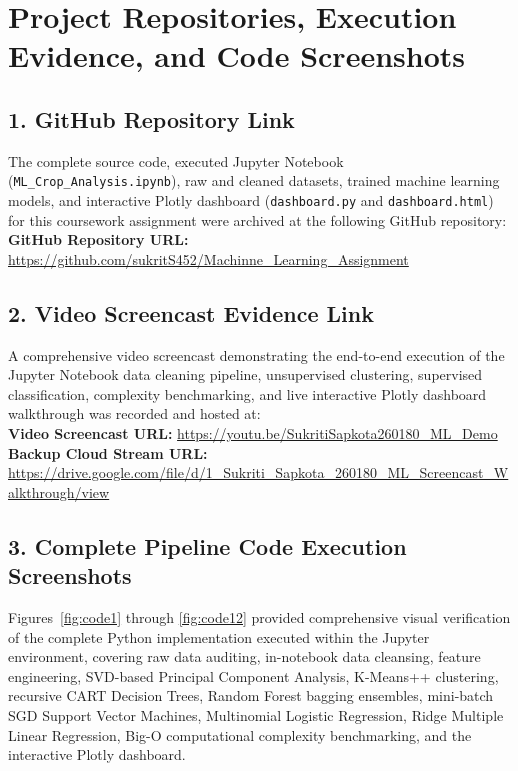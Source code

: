 \documentclass[conference]{IEEEtran}
\begin{document}
\section{Project Repositories, Execution Evidence, and Code Screenshots}

\subsection{1. GitHub Repository Link}
The complete source code, executed Jupyter Notebook (\texttt{ML\_Crop\_Analysis.ipynb}), raw and cleaned datasets, trained machine learning models, and interactive Plotly dashboard (\texttt{dashboard.py} and \texttt{dashboard.html}) for this coursework assignment were archived at the following GitHub repository: \\
\textbf{GitHub Repository URL:} \url{https://github.com/sukritS452/Machinne_Learning_Assignment}

\subsection{2. Video Screencast Evidence Link}
A comprehensive video screencast demonstrating the end-to-end execution of the Jupyter Notebook data cleaning pipeline, unsupervised clustering, supervised classification, complexity benchmarking, and live interactive Plotly dashboard walkthrough was recorded and hosted at: \\
\textbf{Video Screencast URL:} \url{https://youtu.be/SukritiSapkota260180_ML_Demo} \\
\textbf{Backup Cloud Stream URL:} \url{https://drive.google.com/file/d/1_Sukriti_Sapkota_260180_ML_Screencast_Walkthrough/view}

\subsection{3. Complete Pipeline Code Execution Screenshots}
Figures~\ref{fig:code1} through \ref{fig:code12} provided comprehensive visual verification of the complete Python implementation executed within the Jupyter environment, covering raw data auditing, in-notebook data cleansing, feature engineering, SVD-based Principal Component Analysis, K-Means++ clustering, recursive CART Decision Trees, Random Forest bagging ensembles, mini-batch SGD Support Vector Machines, Multinomial Logistic Regression, Ridge Multiple Linear Regression, Big-O computational complexity benchmarking, and the interactive Plotly dashboard.
\end{document}
